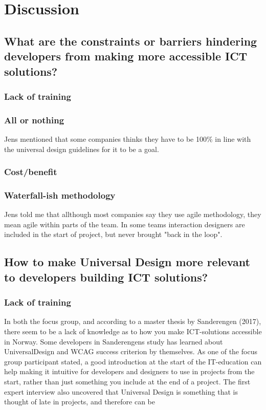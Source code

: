 \chapter{Discussion} \label{discussionchap}

\section{What are the constraints or barriers hindering developers from making more accessible ICT solutions?}
\subsection{Lack of training}
\subsection{All or nothing}
Jens mentioned that some companies thinks they have to be 100\% in line with the universal design guidelines for it to be a goal.

\subsection{Cost/benefit}
\subsection{Waterfall-ish methodology}
Jens told me that allthough most companies say they use agile methodology, they mean agile within parts of the team. In some teams interaction designers are included in the start of project, but never brought "back in the loop".



\section{How to make Universal Design more relevant to developers building ICT solutions?}
\subsection{Lack of training}
In both the focus group, and according to a master thesis by Sanderengen (2017), there seem to be a lack of knowledge as to how you make ICT-solutions accessible in Norway. Some developers in Sanderengens study has learned about \gls{UniversalDesign} and WCAG success criterion by themselves. As one of the focus group participant stated, a good introduction at the start of the IT-education can help making it intuitive for developers and designers to use in projects from the start, rather than just something you include at the end of a project. The first expert interview also uncovered that Universal Design is something that is thought of late in projects, and therefore can be 

